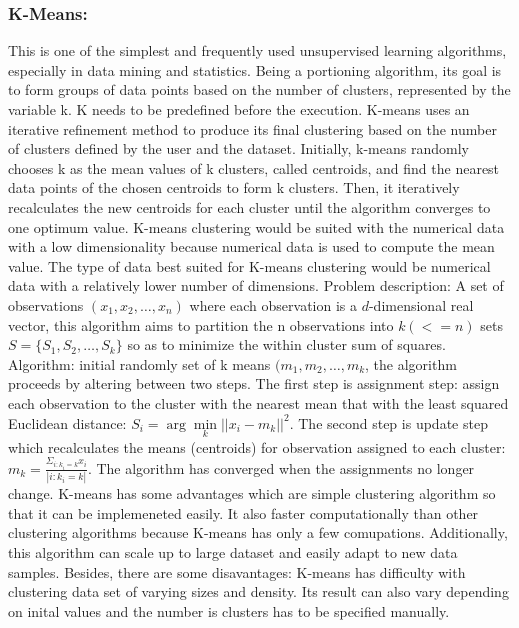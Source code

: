 \documentclass[a4paper,12pt]{report}
\begin{document}
    \subsubsection{K-Means:} 
    This is one of the simplest and frequently used unsupervised learning algorithms, especially in data mining and statistics. Being a portioning algorithm, its goal is to form groups of data points based on the number of clusters, represented by the variable k. K needs to be predefined before the execution. K-means uses an iterative refinement method to produce its final clustering based on the number of clusters defined by the user and the dataset. Initially, k-means randomly chooses k as the mean values of k clusters, called centroids, and find the nearest data points of the chosen centroids to form k clusters. Then, it iteratively recalculates the new centroids for each cluster until the algorithm converges to one optimum value. K-means clustering would be suited with the numerical data with a low dimensionality because numerical data is used to compute the mean value. The type of data best suited for K-means clustering would be numerical data with a relatively lower number of dimensions. 
    \newline\newline
    Problem description\cite{KMeanWiki}: A set of observations $(x_1, x_2, …, x_n)$ where each observation is a $d$-dimensional real vector, this algorithm aims to partition the n observations into $k(<=n)$ sets $S = \{S_1, S_2, …, S_k\}$ so as to minimize the within cluster sum of squares.
    \newline\newline
    Algorithm\cite{KMeanWiki}: initial randomly set of k means $(m_1, m_2, …, m_k$, the algorithm proceeds by altering between two steps.
    The first step is assignment step: assign each observation to the cluster with the nearest mean that with the least squared Euclidean distance:
    $S_i = \arg\min\limits_k||x_i - m_k||^2$. 
    The second step is update step which recalculates the means (centroids) for observation assigned to each cluster:
    $m_k = \frac{\Sigma_{i:k_i=k}x_i}{|i:k_i=k|}$.
    The algorithm has converged when the assignments no longer change.
    \newline\newline
    K-means has some advantages\cite{MinhLeKazuhiroOgata2019} which are simple clustering algorithm so that it can be implemeneted easily. It also faster computationally than other clustering algorithms because K-means has only a few comupations.
    Additionally, this algorithm can scale up to large dataset and easily adapt to new data samples.
    Besides, there are some disavantages: K-means has difficulty with clustering data set of varying sizes and density. Its result can also vary depending on inital values and the number is clusters has to be specified manually.    
\end{document}
